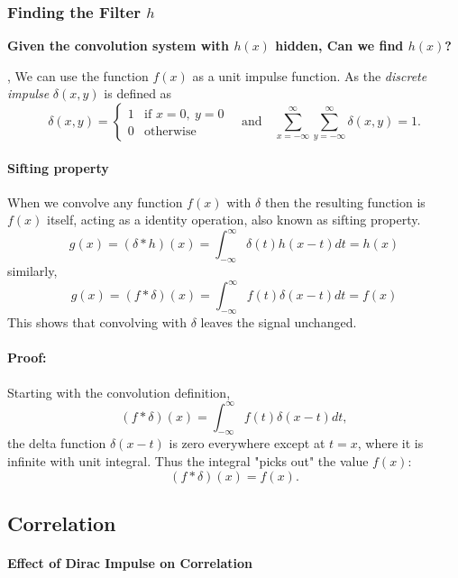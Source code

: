 \subsubsection{Finding the Filter $h$}
\textbf{Given the convolution system with $h(x)$ hidden, Can we find $h(x)$?}

, We can use the function $f(x)$ as a unit impulse function. As the \emph{discrete impulse} $\delta(x, y)$ is defined as
$$
\delta(x, y) = 
\begin{cases}
1 & \text{if } x = 0,~y = 0 \\
0 & \text{otherwise}
\end{cases}
\quad \text{and} \quad \sum_{x =-\infty}^{\infty}\sum_{y = -\infty}^{\infty} \delta(x,y) = 1.
$$

\paragraph{Sifting property}When we convolve any function $f(x)$ with $\delta$ then the resulting function is $f(x)$ itself, acting as a identity operation, also known as sifting property. 
\[
    g(x) = (\delta*h)(x) = \int_{-\infty}^{\infty} \delta(t)h(x-t)dt = h(x)
\]
similarly,
\[
    g(x) = (f*\delta)(x) = \int_{-\infty}^{\infty} f(t)\delta(x-t)dt = f(x)
\]
This shows that convolving with \(\delta\) leaves the signal unchanged.

\paragraph{Proof:}
Starting with the convolution definition,
\[
(f * \delta)(x) = \int_{-\infty}^\infty f(t) \delta(x - t) dt,
\]
the delta function \(\delta(x - t)\) is zero everywhere except at \(t = x\), where it is infinite with unit integral. Thus the integral "picks out" the value \(f(x)\):
\[
(f * \delta)(x) = f(x).
\]

\subsection{Correlation}


\paragraph{Effect of Dirac Impulse on Correlation}

